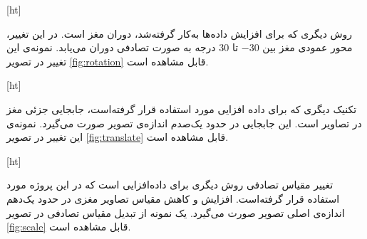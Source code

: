 
[ht]

روش دیگری که برای افزایش داده‌ها به‌کار گرفته‌شد، دوران مغز است. در این 
تغییر، محور عمودی مغز بین $-30$ تا $30$ درجه به صورت تصادفی دوران می‌یابد.
نمونه‌ی این تغییر در تصویر \ref{fig:rotation}
قابل مشاهده است.


[ht]

تکنیک دیگری که برای داده افزایی مورد استفاده قرار گرفته‌است،
جابجایی جزئی مغز در تصاویر است.
این جابجایی در حدود یک‌صدم اندازه‌ی تصویر صورت می‌گیرد.
نمونه‌ی این تغییر در تصویر 
\ref{fig:translate}
قابل مشاهده است.


[ht]


تغییر مقیاس تصادفی روش دیگری برای داده‌افزایی است که در این پروژه مورد استفاده قرار گرفته‌است.
افزایش و کاهش مقیاس تصاویر مغزی در حدود یک‌دهم اندازه‌ی اصلی تصویر صورت می‌گیرد.
یک نمونه از تبدیل مقیاس تصادفی در تصویر 
\ref{fig:scale} قابل مشاهده است.

